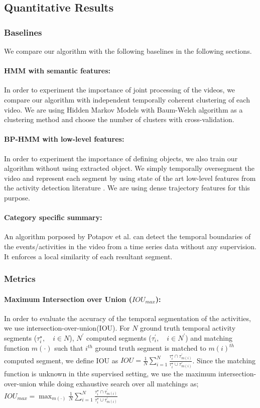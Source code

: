 \subsection{Quantitative Results}
\subsubsection{Baselines}
We compare our algorithm with the following baselines in the following sections.
\paragraph{HMM with semantic features:}
In order to experiment the importance of joint processing of the videos, we compare our algorithm with independent temporally coherent clustering of each video. We are using Hidden Markov Models with Baum-Welch algorithm\cite{rabiner} as a clustering method and choose the number of clusters with cross-validation.
\paragraph{BP-HMM with low-level features:}
In order to experiment the importance of defining objects, we also train our algorithm without using extracted object. We simply temporally oversegment the video and represent each segment by using state of the art low-level features from the activity detection literature \cite{acticityFeature}. We are using dense trajectory features for this purpose.
\paragraph{Category specific summary\cite{potapov2014category}:}
An algorithm porposed by Potapov et al.\cite{potapov2014category} can detect the temporal boundaries of the events/activities in the video from a time series data without any supervision. It enforces a local similarity of each resultant segment.

\subsubsection{Metrics}
\paragraph{Maximum Intersection over Union ($IOU_{max}$):}
In order to evaluate the accuracy of the temporal segmentation of the activities, we use intersection-over-union(IOU). For $N$ ground truth temporal activity segments ($\tau^\star_{i},\quad i\in N$), $N^\prime$ computed segments ($\tau^\prime_{i},\quad i\in N^\prime$) and matching function $m(\cdot)$ such that $i^{th}$ ground truth segment is matched to $m(i)^{th}$ computed segment, we define IOU as \mbox{$IOU=\frac{1}{N}\sum_{i=1}^N \frac{\tau^\star_i \cap \tau^\prime_{m(i)}}{\tau^\star_i \cup \tau^\prime_{m(i)}}$}. Since the matching function is unknown in thte supervised setting, we use the maximum intersection-over-union while doing exhaustive search over all matchings as;
\mbox{$IOU_{max} = \max_{m(\cdot)} \frac{1}{N}\sum_{i=1}^N \frac{\tau^\star_i \cap \tau^\prime_{m(i)}}{\tau^\star_i \cup \tau^\prime_{m(i)}}$}
